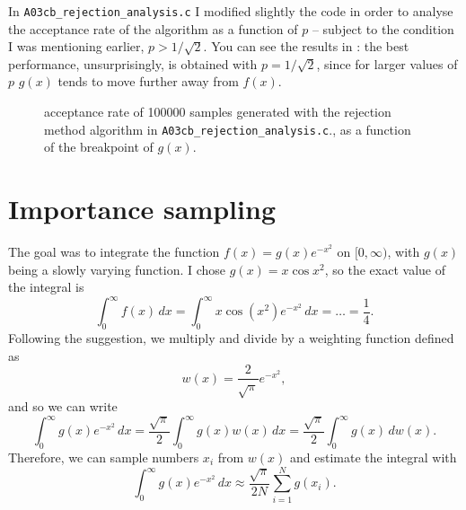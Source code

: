 In \texttt{A03cb\_rejection\_analysis.c} I modified slightly the code in order
to analyse the acceptance rate of the algorithm as a function of $p$ – subject
to the condition I was mentioning earlier, $p > 1 / \sqrt{2}$. You can see the
results in : the best performance, unsurprisingly, is obtained
with $p = 1 / \sqrt{2}$, since for larger values of $p$ $g(x)$ tends to move
further away from $f(x)$.

\begin{figure}
    \centering
    
    \caption{acceptance rate of \num{100000} samples generated with the
        rejection method algorithm in \texttt{A03cb\_rejection\_analysis.c}., as
        a function of the breakpoint of $g(x)$.}
    \label{fig:A03cb}
\end{figure}

\section{Importance sampling}
The goal was to integrate the function $f(x) = g(x) e^{-x^{2}}$ on $[0,
\infty)$, with $g(x)$ being a slowly varying function. I chose $g(x) = x
\cos x^{2}$, so the exact value of the integral is
\begin{equation}
    \int_{0}^{\infty} f(x) \, dx = \int_{0}^{\infty} x \cos(x^2) e^{-x^{2}}\, dx
        = \dots = \frac{1}{4}.
\end{equation}
Following the suggestion, we multiply and divide by a weighting function defined
as
\begin{equation}
    w(x) = \frac{2}{\sqrt{\pi}} e^{-x^{2}},
\end{equation}
and so we can write
\begin{equation}
    \int_{0}^{\infty} g(x) e^{-x^{2}} \, dx = \frac{\sqrt{\pi}}{2} \int_{0}^{\infty} 
        g(x) w(x) \, dx = \frac{\sqrt{\pi}}{2} \int_{0}^{\infty} g(x) \, dw(x).
\end{equation}
Therefore, we can sample numbers $x_i$ from $w(x)$ and estimate the integral
with
\begin{equation}
    \int_{0}^{\infty} g(x) e^{-x^{2}} \, dx \approx \frac{\sqrt{\pi}}{2N}
        \sum_{i = 1}^{N} g(x_i).
\end{equation}

